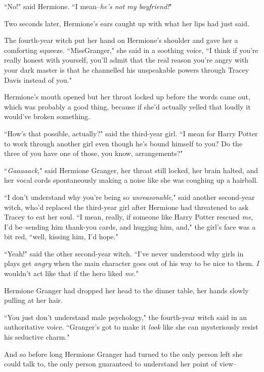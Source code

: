 ``No!" said Hermione. ``I mean\---\emph{he's not my boyfriend!}"

Two seconds later, Hermione's ears caught up with what her lips had just said.

The fourth-year witch put her hand on Hermione's shoulder and gave her a comforting squeeze. ``Miss\?Granger," she said in a soothing voice, ``I think if you're really honest with yourself, you'll admit that the real reason you're angry with your dark master is that he channelled his unspeakable powers through Tracey Davis instead of you."

Hermione's mouth opened but her throat locked up before the words came out, which was probably a good thing, because if she'd actually yelled that loudly it would've broken something.

``How's that possible, actually?" said the third-year girl. ``I mean for Harry Potter to work through another girl even though he's bound himself to you? Do the three of you have one of those, you know, arrangements?"

``\emph{Gaaaaack,}" said Hermione Granger, her throat still locked, her brain halted, and her vocal cords spontaneously making a noise like she was coughing up a hairball.


``I don't understand why you're being so \emph{unreasonable}," said another second-year witch, who'd replaced the third-year girl after Hermione had threatened to ask Tracey to eat her soul. ``I mean, really, if someone like Harry Potter rescued \emph{me}, I'd be\---sending him thank-you cards, and hugging him, and," the girl's face was a bit red, ``well, kissing him, I'd hope."

``Yeah!" said the other second-year witch. ``I've never understood why girls in plays get \emph{angry} when the main character goes out of his way to be nice to them. \emph{I} wouldn't act like that if the hero liked \emph{me}."

Hermione Granger had dropped her head to the dinner table, her hands slowly pulling at her hair.

``You just don't understand male psychology," the fourth-year witch said in an authoritative voice. ``Granger's got to make it \emph{look} like she can mysteriously resist his seductive charm."


And so before long Hermione Granger had turned to the only person left she could talk to, the only person guaranteed to understand her point of view\---

